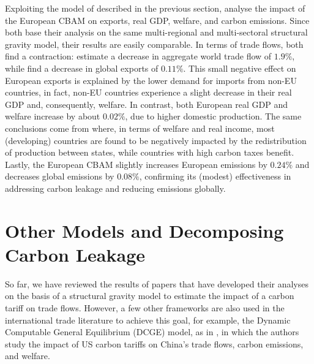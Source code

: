 Exploiting the model of \textcite{Larch2017} described in the previous section, \textcite{Korpar2023} analyse the impact of the European CBAM on exports, real GDP, welfare, and carbon emissions. Since both base their analysis on the same multi-regional and multi-sectoral structural gravity model, their results are easily comparable. In terms of trade flows, both find a contraction: \textcite{Larch2017} estimate a decrease in aggregate world trade flow of $1.9\%$, while \textcite{Korpar2023} find a decrease in global exports of $0.11\%$. This small negative effect on European exports is explained by the lower demand for imports from non-EU countries, in fact, non-EU countries experience a slight decrease in their real GDP and, consequently, welfare. In contrast, both European real GDP and welfare increase by about $0.02\%$, due to higher domestic production. The same conclusions come from \textcite{Larch2017} where, in terms of welfare and real income, most (developing) countries are found to be negatively impacted by the redistribution of production between states, while countries with high carbon taxes benefit. Lastly, the European CBAM slightly increases European emissions by $0.24\%$ and decreases global emissions by $0.08\%$, confirming its (modest) effectiveness in addressing carbon leakage and reducing emissions globally.

\section{Other Models and Decomposing Carbon Leakage}

So far, we have reviewed the results of papers that have developed their analyses on the basis of a structural gravity model to estimate the impact of a carbon tariff on trade flows. However, a few other frameworks are also used in the international trade literature to achieve this goal, for example, the Dynamic Computable General Equilibrium (DCGE) model, as in \textcite{Zhang2019}, in which the authors study the impact of US carbon tariffs on China's trade flows, carbon emissions, and welfare.

